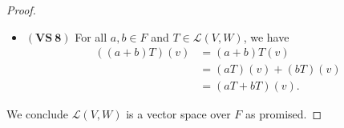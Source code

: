 \begin{Exercise}
\begin{proof}
\begin{itemize}
			\item $\mathbf{(VS\ 8)}$
			For all $a,b\in F$ and $T\in \mathcal{L}(V,W)$, we have
			\begin{align*}
			((a+b)T)(v)
			&= (a+b)T(v) \\
			&= (a T)(v) + (b T)(v) \\
			&= (a T + b T)(v).
			\end{align*}
		\end{itemize}
		We conclude $\mathcal{L}(V,W)$ is a vector space over $F$ as promised.
	\end{proof}
\end{Exercise}
